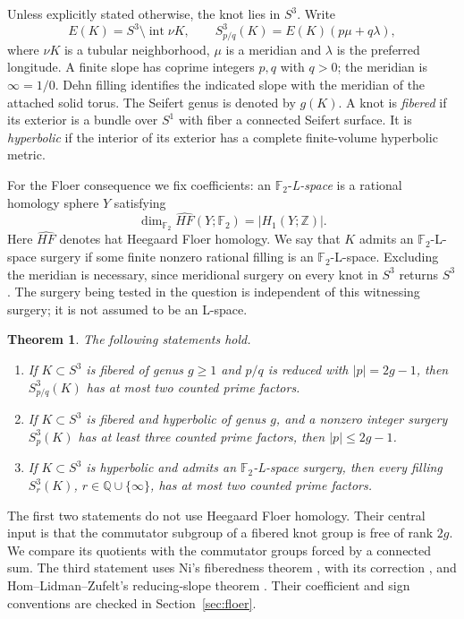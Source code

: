 \documentclass[11pt]{article}
\newtheorem{theorem}{Theorem}[section]
\theoremstyle{remark}
\newcommand{\Z}{\mathbb Z}
\newcommand{\Q}{\mathbb Q}
\newcommand{\F}{\mathbb F_2}
\newcommand{\HF}{\widehat{HF}}
\begin{document}
Unless explicitly stated otherwise, the knot lies in $S^3$. Write
\[
 E(K)=S^3\setminus\operatorname{int}\nu K,
 \qquad S^3_{p/q}(K)=E(K)(p\mu+q\lambda),
\]
where $\nu K$ is a tubular neighborhood, $\mu$ is a meridian and $\lambda$ is the preferred longitude. A finite slope has coprime integers $p,q$ with $q>0$; the meridian is $\infty=1/0$. Dehn filling identifies the indicated slope with the meridian of the attached solid torus. The Seifert genus is denoted by $g(K)$. A knot is \emph{fibered} if its exterior is a bundle over $S^1$ with fiber a connected Seifert surface. It is \emph{hyperbolic} if the interior of its exterior has a complete finite-volume hyperbolic metric.

For the Floer consequence we fix coefficients: an $\F$-\emph{L-space} is a rational homology sphere $Y$ satisfying
\[
 \dim_{\F}\HF(Y;\F)=|H_1(Y;\Z)|.
\]
Here $\HF$ denotes hat Heegaard Floer homology. We say that $K$ admits an $\F$-L-space surgery if some finite nonzero rational filling is an $\F$-L-space. Excluding the meridian is necessary, since meridional surgery on every knot in $S^3$ returns $S^3$. The surgery being tested in the question is independent of this witnessing surgery; it is not assumed to be an L-space.

\begin{theorem}\label{thm:main}
The following statements hold.
\begin{enumerate}
\item If $K\subset S^3$ is fibered of genus $g\geq1$ and $p/q$ is reduced with $|p|=2g-1$, then $S^3_{p/q}(K)$ has at most two counted prime factors.
\item If $K\subset S^3$ is fibered and hyperbolic of genus $g$, and a nonzero integer surgery $S^3_p(K)$ has at least three counted prime factors, then $|p|\leq2g-1$.
\item If $K\subset S^3$ is hyperbolic and admits an $\F$-L-space surgery, then every filling $S^3_r(K)$, $r\in\Q\cup\{\infty\}$, has at most two counted prime factors.
\end{enumerate}
\end{theorem}

The first two statements do not use Heegaard Floer homology. Their central input is that the commutator subgroup of a fibered knot group is free of rank $2g$. We compare its quotients with the commutator groups forced by a connected sum. The third statement uses Ni's fiberedness theorem \cite[Corollary~1.3]{Ni}, with its correction \cite{NiErr}, and Hom--Lidman--Zufelt's reducing-slope theorem \cite[Theorem~1.3]{HLZ}. Their coefficient and sign conventions are checked in Section~\ref{sec:floer}.
\end{document}
